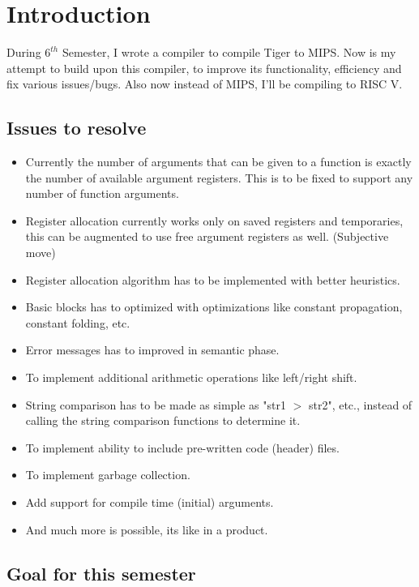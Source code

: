 \chapter{Introduction}
\hspace{3mm}

During $6^{th}$ Semester, I wrote a compiler to compile Tiger to MIPS. Now is my attempt to build upon this compiler, to improve its functionality, efficiency and fix various issues/bugs. Also now instead of MIPS, I'll be compiling to RISC V.

\section{Issues to resolve}

\begin{itemize}
  \item Currently the number of arguments that can be given to a function is exactly the number of available argument registers. This is to be fixed to support any number of function arguments.
  \item Register allocation currently works only on saved registers and temporaries, this can be augmented to use free argument registers as well. (Subjective move)
  \item Register allocation algorithm has to be implemented with better heuristics.
  \item Basic blocks has to optimized with optimizations like constant propagation, constant folding, etc.
  \item Error messages has to improved in semantic phase. 
  \item To implement additional arithmetic operations like left/right shift.
  \item String comparison has to be made as simple as "str1 $>$ str2", etc.,  instead of calling the string comparison functions to determine it.
  \item To implement ability to include pre-written code (header) files.
  \item To implement garbage collection.
  \item Add support for compile time (initial) arguments.
  \item And much more is possible, its like in a product.
\end{itemize}

\section{Goal for this semester}

